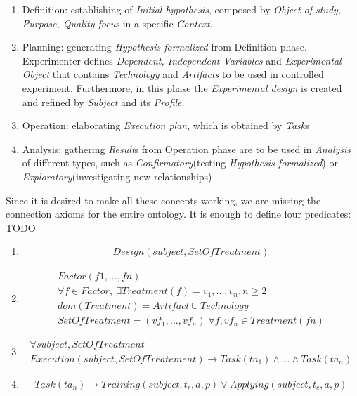 	\begin{enumerate}
		\item Definition: establishing of \textit{Initial hypothesis}, composed by \textit{Object of study, Purpose, Quality focus} in a specific \textit{Context}.
		\item Planning: generating \textit{Hypothesis formalized} from Definition phase. Experimenter defines \textit{Dependent, Independent Variables} and \textit{Experimental Object} that contains \textit{Technology} and \textit{Artifacts} to be used in controlled experiment. Furthermore, in this phase the \textit{Experimental design} is created and refined by \textit{Subject} and its \textit{Profile}.
		\item Operation: elaborating \textit{Execution plan}, which is obtained by \textit{Task}s 
		\item Analysis: gathering \textit{Result}s from Operation phase are to be used in \textit{Analysis} of different types, such as \textit{Confirmatory}(testing \textit{Hypothesis formalized}) or \textit{Exploratory}(investigating new relationships)   
	\end{enumerate}
	Since it is desired to make all these concepts working, we are missing the connection axioms for the entire ontology. It is enough to define four predicates:
	TODO
	\begin{enumerate}
		\item
		\begin{align*}
		 Design(subject, SetOfTreatment)
		\end{align*} 
		\item 
		\begin{align*}
			Factor(f1,...,fn) \\
			 \forall f \in Factor,\ \exists Treatment(f) = {v_1,...,v_n}, n \ge 2 \\
			dom(Treatment) = Artifact \cup Technology \\
			SetOfTreatment = (vf_1,...,vf_n)|\forall f, vf_n \in Treatment(fn)
		\end{align*}
		\item 
		\begin{align*}
			\forall subject, SetOfTreatment \\
			Execution(subject, SetOfTreatement) \rightarrow Task(ta_1) \land...\land Task(ta_n)
		\end{align*}
		\item 
		\begin{align*}
			Task(ta_n) \rightarrow Training(subject,t_r,a,p) \lor Applying(subject,t_e,a,p)
		\end{align*}
		
	\end{enumerate}
